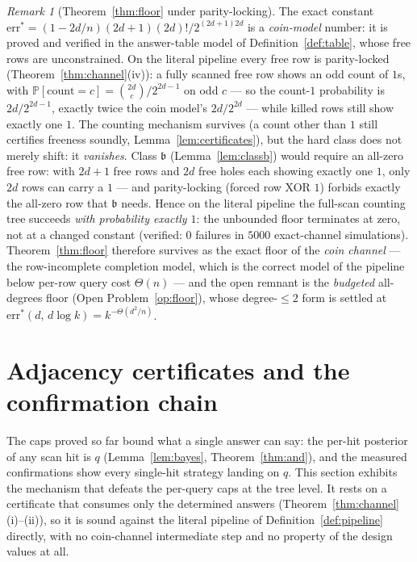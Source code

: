 \documentclass[11pt]{article}
\theoremstyle{definition}
\theoremstyle{remark}
\newtheorem{remark}[theorem]{Remark}
\newcommand{\Prob}{\mathbb{P}}
\begin{document}
\begin{remark}[Theorem~\ref{thm:floor} under parity-locking]
\label{rem:parityfloor}
The exact constant
$\mathrm{err}^*=(1-2d/n)(2d+1)(2d)!/2^{(2d+1)2d}$ is a
\emph{coin-model} number: it is proved and verified in the
answer-table model of Definition~\ref{def:table}, whose free rows are
unconstrained.  On the literal pipeline every free row is
parity-locked (Theorem~\ref{thm:channel}(iv)): a fully scanned free
row shows an odd count of $1$s, with
$\Prob[\text{count}=c]=\binom{2d}{c}/2^{2d-1}$ on odd $c$ --- so the
count-$1$ probability is $2d/2^{2d-1}$, exactly twice the coin model's
$2d/2^{2d}$ --- while killed rows still show exactly one $1$.  The
counting mechanism survives (a count other than $1$ still certifies
freeness soundly, Lemma~\ref{lem:certificates}), but the hard class
does not merely shift: it \emph{vanishes}.  Class
$\mathfrak{b}$ (Lemma~\ref{lem:classb}) would require an all-zero free
row: with $2d+1$ free rows and $2d$ free holes each showing exactly
one $1$, only $2d$ rows can carry a $1$ --- and parity-locking
(forced row XOR $1$) forbids exactly the all-zero row that
$\mathfrak{b}$ needs.  Hence on the literal pipeline the full-scan
counting tree succeeds \emph{with probability exactly $1$}: the
unbounded floor terminates at zero, not at a changed constant
(verified: $0$ failures in $5000$ exact-channel simulations).
Theorem~\ref{thm:floor} therefore survives as the exact floor of the
\emph{coin channel} --- the row-incomplete completion model, which is
the correct model of the pipeline below per-row query cost
$\Theta(n)$ --- and the open remnant is the \emph{budgeted}
all-degrees floor (Open Problem~\ref{op:floor}), whose
degree-$\le 2$ form is settled at
$\mathrm{err}^*(d,\,d\log k)=k^{-\Theta(d^2/n)}$.
\end{remark}

\section{Adjacency certificates and the confirmation chain}
\label{sec:adjacency}

The caps proved so far bound what a single answer can say: the per-hit
posterior of any scan hit is $q$ (Lemma~\ref{lem:bayes},
Theorem~\ref{thm:and}), and the measured confirmations show every
single-hit strategy landing on $q$.  This section exhibits the
mechanism that defeats the per-query caps at the tree level.  It rests
on a certificate that consumes only the determined answers
(Theorem~\ref{thm:channel}(i)--(ii)), so it is sound against the
literal pipeline of Definition~\ref{def:pipeline} directly, with no
coin-channel intermediate step and no property of the design values at
all.
\end{document}
